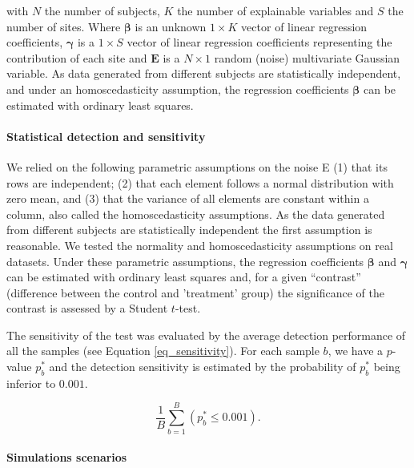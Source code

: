 \documentclass[authoryear]{elsarticle}
\begin{document}
with $N$ the number of subjects, $K$ the number of explainable variables and $S$ the number of sites. Where $\mathbf{\beta}$ is an unknown $1\times K$ vector of linear regression coefficients, $\mathbf{\gamma}$ is a $1\times S$ vector of linear regression coefficients representing the contribution of each site and $\mathbf{E}$ is a $N\times 1$ random (noise) multivariate Gaussian variable. As data generated from different subjects are statistically independent, and under an homoscedasticity assumption, the regression coefficients $\mathbf{\beta}$ can be estimated with ordinary least squares.

\paragraph{Statistical detection and sensitivity}

We relied on the following parametric assumptions on the noise E (1) that its rows are independent; (2) that each element follows a normal distribution with zero mean, and (3) that the variance of all elements are constant within a column, also called the homoscedasticity assumptions. As the data generated from different subjects are statistically independent the first assumption is reasonable. We tested the normality and homoscedasticity assumptions on real datasets. Under these parametric assumptions, the regression coefficients $\mathbf{\beta}$ and $\mathbf{\gamma}$ can be estimated with ordinary least squares and, for a given “contrast” (difference between the control and 'treatment' group) the significance of the contrast is assessed by a Student $t$-test.

The sensitivity of the test was evaluated by the average detection performance of all the samples (see Equation \ref{eq_sensitivity}). For each sample $b$, we have a $p$-value $p^{*}_b$ and the detection sensitivity is estimated by the probability of $p^{*}_b$ being inferior to $0.001$.

\begin{equation}\label{Detection power}  
    \frac{1}{B}\sum\limits_{b=1}^B\left(p^{*}_b\leq0.001\right).
    \label{eq_sensitivity}
\end{equation}



\paragraph{Simulations scenarios}
\end{document}
